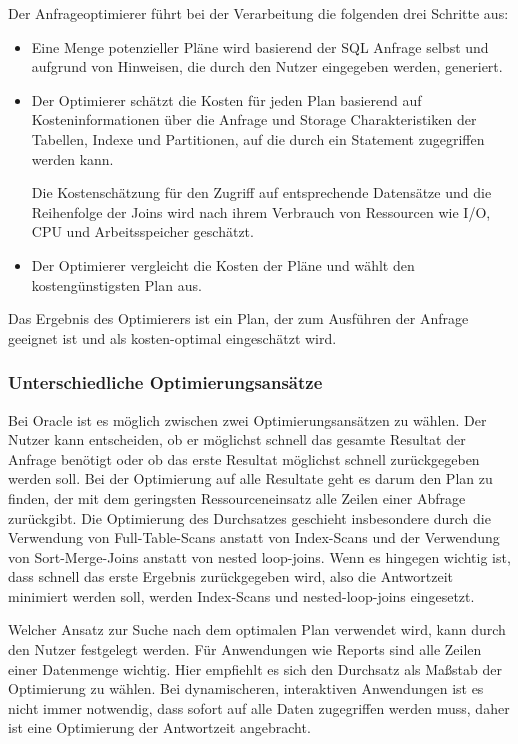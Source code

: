 Der Anfrageoptimierer führt bei der Verarbeitung die folgenden drei Schritte aus:

\begin{itemize}
\item Eine Menge potenzieller Pläne wird basierend der SQL Anfrage selbst und aufgrund von Hinweisen, die durch den Nutzer eingegeben werden, generiert.

\item Der Optimierer schätzt die Kosten für jeden Plan basierend auf Kosteninformationen über die Anfrage und Storage Charakteristiken der Tabellen, Indexe und Partitionen, auf die durch ein Statement zugegriffen werden kann.

Die Kostenschätzung für den Zugriff auf entsprechende Datensätze und die Reihenfolge der Joins wird nach ihrem Verbrauch von Ressourcen wie I/O, CPU und Arbeitsspeicher geschätzt.

\item Der Optimierer vergleicht die Kosten der Pläne und wählt den kostengünstigsten Plan aus.
\end{itemize}

Das Ergebnis des Optimierers ist ein Plan, der zum Ausführen der Anfrage geeignet ist und als kosten-optimal eingeschätzt wird.


\subsubsection{Unterschiedliche Optimierungsansätze}



Bei Oracle ist es möglich zwischen zwei Optimierungsansätzen zu wählen. Der Nutzer kann entscheiden, ob er möglichst schnell das gesamte Resultat der Anfrage benötigt oder ob das erste Resultat möglichst schnell zurückgegeben werden soll. Bei der Optimierung auf alle Resultate geht es darum den Plan zu finden, der mit dem geringsten Ressourceneinsatz alle Zeilen einer Abfrage zurückgibt. Die Optimierung des Durchsatzes geschieht insbesondere durch die Verwendung von Full-Table-Scans anstatt von Index-Scans und der Verwendung von Sort-Merge-Joins anstatt von nested loop-joins. Wenn es hingegen wichtig ist, dass schnell das erste Ergebnis zurückgegeben wird, also die Antwortzeit minimiert werden soll, werden Index-Scans und nested-loop-joins eingesetzt.

Welcher Ansatz zur Suche nach dem optimalen Plan verwendet wird, kann durch den Nutzer festgelegt werden. Für Anwendungen wie Reports sind alle Zeilen einer Datenmenge wichtig. Hier empfiehlt es sich den Durchsatz als Maßstab der Optimierung zu wählen. Bei dynamischeren, interaktiven Anwendungen ist es nicht immer notwendig, dass sofort auf alle Daten zugegriffen werden muss, daher ist eine Optimierung der Antwortzeit angebracht.


